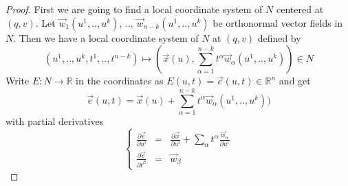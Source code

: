 \documentclass[a4paper,11pt,reqno]{amsart}
\newcommand{\RR}{\mathbb{R}}      %
\newcommand{\vect}[1]{\vec{#1}}
\begin{document}
\begin{proof}
  First we are going to find a local coordinate system of $N$ centered at $(q,
  v)$. Let $\vect{w}_1(u^1, .., u^k)$, .., $\vect{w}_{n-k}(u^1, .., u^k)$ be
  orthonormal vector fields in $N$. Then we have a local coordinate system of
  $N$ at $(q, v)$ defined by
  \begin{equation}
    (u^1, .., u^k, t^1, .., t^{n-k}) \mapsto (\vect{x}(u),
    \sum_{\alpha=1}^{n-k}t^{\alpha} \vect{w}_{\alpha}(u^1, .., u^k)) \in N
  \end{equation}
  Write $E: N \to \RR$ in the coordinates as $E(u, t) = \vect{e}(u, t) \in
  \RR^n$ and get
  \begin{equation}
    \vect{e}(u, t) = \vect{x}(u) + \sum_{\alpha=1}^{n-k}t^{\alpha} \vect{w}_{\alpha}(u^1, .., u^k))
  \end{equation}
  with partial derivatives
  \begin{equation}
    \left\{
      \begin{array}{lcl}
        \frac{\partial \vect{e}}{\partial u^i} & = &
        \frac{\partial \vect{x}}{\partial u^i} + 
        \sum_{\alpha} t^{\alpha}\frac{\vect{w}_{\alpha}}{\partial u^i}  \\
        \frac{\partial \vect{e}}{\partial t^\beta} & = & \vect{w}_\beta
      \end{array}
    \right.
  \end{equation}
  

\end{proof}
\end{document}
